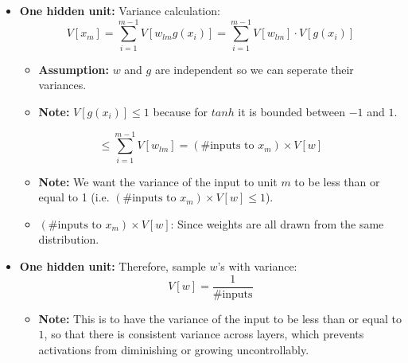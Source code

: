 \begin{summary}
\begin{itemize}
        \item \textbf{One hidden unit:} Variance calculation:
        \[
        V[x_m] = \sum_{i=1}^{m-1} V[w_{lm} g(x_i)] = \sum_{i=1}^{m-1} V[w_{lm}] \cdot V[g(x_i)]
        \]
        \begin{itemize}
            \item \textbf{Assumption:} $w$ and $g$ are independent so we can seperate their variances.
            \item \textbf{Note:} $V[g(x_i)] \leq 1$ because for $tanh$ it is bounded between $-1$ and $1$.
        \end{itemize}
        \[
        \leq \sum_{i=1}^{m-1} V[w_{lm}] = (\#\text{inputs to } x_m) \times V[w]
        \]
        \begin{itemize}
            \item \textbf{Note:} We want the variance of the input to unit $m$ to be less than or equal to 1 (i.e. $(\#\text{inputs to } x_m) \times V[w] \leq 1$).
            \item $(\#\text{inputs to } x_m) \times V[w]$: Since weights are all drawn from the same distribution. 
        \end{itemize}
    
        \item \textbf{One hidden unit:} Therefore, sample \( w \)'s with variance:
        \[
            V[w] = \frac{1}{\#\text{inputs}}
        \]
        \begin{itemize}
            \item \textbf{Note:} This is to have the variance of the input to be less than or equal to $1$, so that there is consistent variance across layers, which prevents activations from diminishing or growing uncontrollably.
        \end{itemize}
    \end{itemize}
\end{summary}

